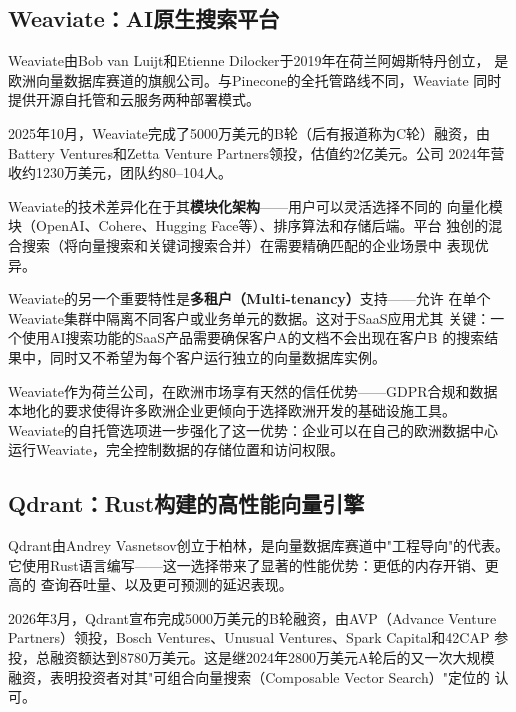 \subsection{Weaviate：AI原生搜索平台}
\label{subsec:weaviate}

Weaviate由Bob van Luijt和Etienne Dilocker于2019年在荷兰阿姆斯特丹创立，
是欧洲向量数据库赛道的旗舰公司。与Pinecone的全托管路线不同，Weaviate
同时提供开源自托管和云服务两种部署模式。

2025年10月，Weaviate完成了5000万美元的B轮（后有报道称为C轮）融资，由
Battery Ventures和Zetta Venture Partners领投，估值约2亿美元。公司
2024年营收约1230万美元，团队约80--104人。

Weaviate的技术差异化在于其\textbf{模块化架构}——用户可以灵活选择不同的
向量化模块（OpenAI、Cohere、Hugging Face等）、排序算法和存储后端。平台
独创的混合搜索（将向量搜索和关键词搜索合并）在需要精确匹配的企业场景中
表现优异。

Weaviate的另一个重要特性是\textbf{多租户（Multi-tenancy）}支持——允许
在单个Weaviate集群中隔离不同客户或业务单元的数据。这对于SaaS应用尤其
关键：一个使用AI搜索功能的SaaS产品需要确保客户A的文档不会出现在客户B
的搜索结果中，同时又不希望为每个客户运行独立的向量数据库实例。

Weaviate作为荷兰公司，在欧洲市场享有天然的信任优势——GDPR合规和数据
本地化的要求使得许多欧洲企业更倾向于选择欧洲开发的基础设施工具。
Weaviate的自托管选项进一步强化了这一优势：企业可以在自己的欧洲数据中心
运行Weaviate，完全控制数据的存储位置和访问权限。

\subsection{Qdrant：Rust构建的高性能向量引擎}
\label{subsec:qdrant}

Qdrant由Andrey Vasnetsov创立于柏林，是向量数据库赛道中"工程导向"的代表。
它使用Rust语言编写——这一选择带来了显著的性能优势：更低的内存开销、更高的
查询吞吐量、以及更可预测的延迟表现。

2026年3月，Qdrant宣布完成5000万美元的B轮融资，由AVP（Advance Venture
Partners）领投，Bosch Ventures、Unusual Ventures、Spark Capital和42CAP
参投，总融资额达到8780万美元。这是继2024年2800万美元A轮后的又一次大规模
融资，表明投资者对其"可组合向量搜索（Composable Vector Search）"定位的
认可。

